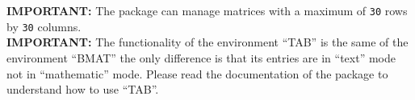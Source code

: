 \documentclass[a4paper]{article}
\begin{document}
\textbf{IMPORTANT:} The package can manage matrices with a maximum 
of \verb|30| rows by \verb|30| columns.\\
%
\textbf{IMPORTANT:} The functionality of the environment ``TAB'' is 
the same of the environment ``BMAT'' the only difference is that its 
entries are in ``text'' mode not in ``mathematic'' mode. Please read 
the documentation of the package  to understand
how to use ``TAB''.
\end{document}
